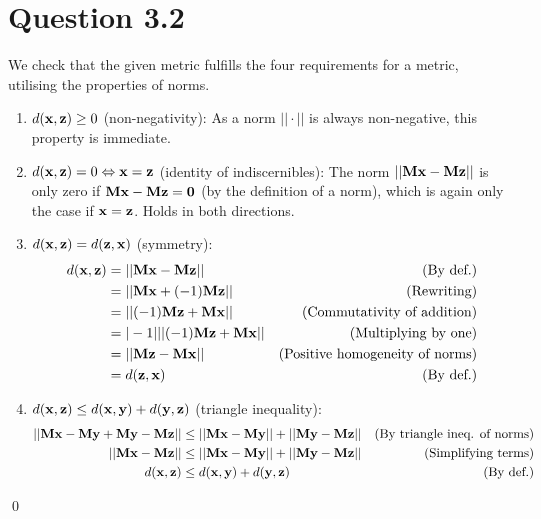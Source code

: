 \documentclass[a4paper, oneside, final]{memoir}
\begin{document}
\newpage
\section*{Question 3.2}

We check that the given metric fulfills the four requirements for a
metric, utilising the properties of norms.

\begin{enumerate}
\item $d(\bold{x},\bold{z}) \geq 0$ (non-negativity): As a norm
  $||\cdot||$ is always non-negative, this property is immediate.
\item $d(\bold{x},\bold{z}) = 0 \Leftrightarrow \bold{x}=\bold{z}$ (identity of
  indiscernibles): The norm $||\bold{Mx}-\bold{Mz}||$ is only zero if
  $\bold{Mx}-\bold{Mz}=\bold{0}$ (by the definition of a norm), which
  is again only the case if $\bold{x}=\bold{z}$.  Holds in both
  directions.
\item $d(\bold{x},\bold{z}) = d(\bold{z},\bold{x})$ (symmetry):
  \begin{align*}
    d(\bold{x},\bold{z})&=||\bold{Mx}-\bold{Mz}||&\text{(By def.)} \\
    &=||\bold{Mx}+(-1)\bold{Mz}||&\text{(Rewriting)} \\
    &=||(-1)\bold{Mz}+\bold{Mx}||&\text{(Commutativity of addition)} \\
    &=|-1|||(-1)\bold{Mz}+\bold{Mx}||&\text{(Multiplying by one)} \\
    &=||\bold{Mz}-\bold{Mx}||&\text{(Positive homogeneity of norms)} \\
    &=d(\bold{z},\bold{x})&\text{(By def.)}
\end{align*}
\item $d(\bold{x}, \bold{z}) \leq d(\bold{x}, \bold{y}) + d(\bold{y},
  \bold{z})$ (triangle inequality):
  \begin{align*}
    ||\bold{Mx}-\bold{My}+\bold{My}-\bold{Mz}|| &\leq ||\bold{Mx}-\bold{My}|| + ||\bold{My}-\bold{Mz}||&\text{(By triangle ineq. of norms)}\\
    ||\bold{Mx}-\bold{Mz}|| &\leq ||\bold{Mx}-\bold{My}|| + ||\bold{My}-\bold{Mz}||&\text{(Simplifying terms)}\\
    d(\bold{x}, \bold{z}) &\leq d(\bold{x}, \bold{y}) + d(\bold{y}, \bold{z})&\text{(By def.)}
  \end{align*}
\end{enumerate}\qed
\end{document}
